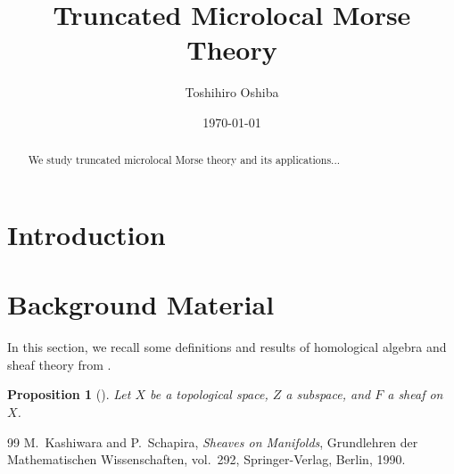 \documentclass[11pt,reqno]{amsart}
\title{Truncated Microlocal Morse Theory}
\author{Toshihiro Oshiba}
\date{\today}
\theoremstyle{plain}
\newtheorem{proposition}[theorem]{Proposition}
\theoremstyle{definition}
\theoremstyle{remark}
\numberwithin{equation}{section}
\begin{document}
\begin{abstract}
We study truncated microlocal Morse theory and its applications...
\end{abstract}

\maketitle

\section{Introduction}\label{sec:intro}

\section{Background Material}\label{sec:review}

In this section, we recall some definitions and results of homological algebra and sheaf theory from \cite{KS90}.

\begin{proposition}[{\cite[Proposition 2.5.1]{KS90}}]\label{prop:ks2.5.1}
Let $X$ be a topological space, $Z$ a subspace, and $F$ a sheaf on $X$.
\end{proposition}

\begin{thebibliography}{99}
M.~Kashiwara and P.~Schapira,
\textit{Sheaves on Manifolds},
Grundlehren der Mathematischen Wissenschaften, vol.~292, Springer-Verlag, Berlin, 1990.
\end{thebibliography}
\end{document}
